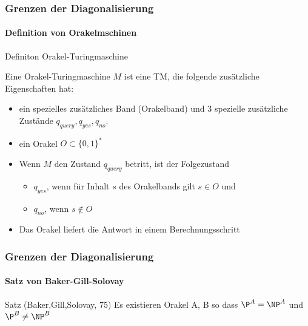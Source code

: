 \begin{frame}
	\frametitle{Grenzen der Diagonalisierung}
	\framesubtitle{Definition von Orakelmschinen}
	\begin{KITinfoblock}{Definiton Orakel-Turingmaschine} {
			Eine Orakel-Turingmaschine $M$ ist eine TM, die folgende zusätzliche Eigenschaften hat:
			\begin{itemize}
				\item<2-> ein spezielles zusätzliches Band (Orakelband) und 3 spezielle zusätzliche Zustände $q_{query}, q_{yes}, q_{no}$.
				\item <3-> ein Orakel $O \subset \{0,1\}^*$
				\item <4-> Wenn $M$ den Zustand $q_{query}$ betritt, ist der Folgezustand
					\begin{itemize}
					\item $q_{yes}$, wenn für Inhalt $s$ des Orakelbands gilt $s \in O$ und
				    \item	$q_{no}$, wenn  $s \notin O$ 
					\end{itemize} 
				\item<5-> Das Orakel liefert die Antwort in einem Berechnungsschritt
			\end{itemize}
		}
	\end{KITinfoblock}
\end{frame}
\begin{frame}
	\frametitle{Grenzen der Diagonalisierung}
	\framesubtitle{Satz von Baker-Gill-Solovay}
	\begin{KITinfoblock}{Satz (Baker,Gill,Solovay, 75)}
		Es existieren Orakel A, B so dass ${\P}^A = {\NP}^A$ und ${\P}^B \neq {\NP}^B$
	\end{KITinfoblock}
	\bigskip
	\pause
	\begin{overprint}
		
	\end{overprint}
\end{frame}

